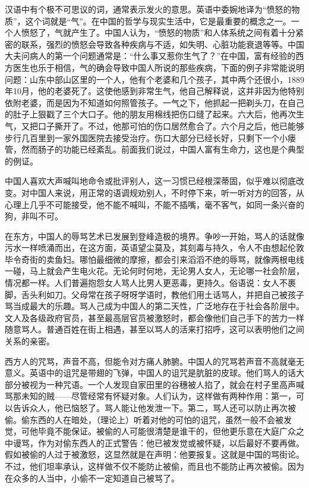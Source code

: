 \documentclass[12pt,oneside]{book}
\begin{document}
\begin{common-format}
汉语中有个极不可思议的词，通常表示发火的意思。英语中委婉地译为“愤怒的物质”，这个词就是“气”。在中国的哲学与现实生活中，它是最重要的概念之一。一个人愤怒了，气就产生了。中国人认为，“愤怒的物质”和人体系统之间有着十分紧密的联系，强烈的愤怒会导致各种疾病与不适，如失明、心脏功能衰退等等。中国大夫问病人的第一个问题通常是：“什么事又惹你生气了？”在中国，富有经验的西方医生也乐于相信，气的确会导致中国人所说的那些疾病，下面的例子非常能说明问题：山东中部山区里的一个人，他有个老婆和几个孩子，其中两个还很小，1889年10月，他的老婆死了。这使他感到非常生气，他自己解释说，这并非因为他特别依附老婆，而是因为不知道如何照管孩子。一气之下，他抓起一把剃头刀，在自己的肚子上狠戳了三个大口子。他的朋友用棉线把伤口缝了起来。六大后，他再次生气，又把口子撕开了。不过，他那可怕的伤口居然愈合了。六个月之后，他已能够步行几百里到一家外国医院去接受治疗。伤口大部分已经长好，只剩下一个小瘘管，然而肠子的功能已经紊乱。前面我们说过，中国人富有生命力，这也是个典型的例证。 

中国人喜欢大声喊叫地命令或批评别人，这一习惯已经根深蒂固，似乎难以彻底改变。对中国人来说，用正常的语调规劝别人，不时停下来，听一听对方的回答，从心理上几乎不可能接受，他不能不喊叫，不能不插嘴，毫不客气，如同一条兴奋的狗，非叫不可。 

在东方，中国人的辱骂艺术已发展到登峰造极的境界。争吵一开始，骂人的话就像污水一样喷涌而出，在这方面，英语望尘莫及，其刻毒与持久，令人不由想起伦敦毕令奇街的卖鱼妇。哪怕最细微的摩擦，都会引来滔滔不绝的辱骂，就像两根电线一碰，马上就会产生电火花。无论何时何地，无论男人女人，无论哪一社会阶层，情况都一样。人们普遍抱怨女人骂人比男人更恶毒，更持久。俗语说：女人不裹脚，舌头利如刀。父母常在孩子呀呀学语时，教他们用土话骂人，并把自己被孩子骂当成最大的乐趣。骂人己成为中国人的第二天性，广泛地存在于社会各阶层中。文人及各级政府官员，甚至最高层官员被激怒时，都会像他们自己手下的苦力一样随意骂人。普通百姓在街上相遇，甚至以骂人的活来打招呼，这可以表明他们之间关系的亲密。 

西方人的咒骂，声音不高，但能令对方痛人肺腑。中国人的咒骂若声音不高就毫无意义。英语中的诅咒是带翅的飞弹，中国人的诅咒是肮脏的皮球。他们骂人的话大部分被视为一种咒语。一个人发现自家田里的谷穗被人掐了，就会在村子里高声喊骂那未知的贼——尽管经常有怀疑对象。人们认为，这样做有两种作用：第一，可以告诉众人，他已恼怒了。骂人能让他发泄一下。第二，骂人还可以防止再次被偷。偷东西的人在暗处，（理论上）听着对他的可怕的诅咒，虽然一般不会被发觉，可他毕竟不能保证。被偷的人可能很清楚是谁干的，但他更乐意在大庭广众之中谩骂，作为对偷东西人的正式警告：他已被发觉或被怀疑，以后最好不要再做。假如被偷的人过于被激怒，这显然就是在声明：他要报复。这就是中国的骂街论。不过，他们坦率承认，这样做不仅不能防止被偷，而且也不能防止再次被偷。因为在众多的人当中，小偷不一定知道自己被骂了。 


\end{common-format}
\end{document}
